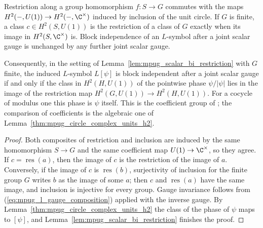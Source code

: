 \begin{lemma}
    \label{lem:mpug_scalar_bi_restriction_circle}
    \leanok
    Restriction along a group homomorphism $f\colon S\to G$ commutes with
    the maps $H^2(-,U(1))\to H^2(-,\C^\times)$ induced by inclusion of the
    unit circle. If $G$ is finite, a class $c\in H^2(S,U(1))$ is the
    restriction of a class of $G$ exactly when its image in
    $H^2(S,\C^\times)$ is. Block independence of an $L$-symbol after
    a joint scalar gauge is unchanged by any further joint scalar gauge.

    Consequently, in the setting of Lemma~\ref{lem:mpug_scalar_bi_restriction}
    with $G$ finite, the induced $L$-symbol $L[\psi]$ is block independent
    after a joint scalar gauge if and only if the class in $H^2(H,U(1))$ of
    the pointwise phase $\psi/|\psi|$ lies in the image of the restriction map
    $H^2(G,U(1))\to H^2(H,U(1))$. For a cocycle of modulus one this phase is
    $\psi$ itself. This is the coefficient group of
    \cite[lines~7042--7064]{FrancoRubio2025MPUGauging}; the comparison of
    coefficients is the algebraic one of
    Lemma~\ref{thm:mpug_circle_complex_units_h2}.
\end{lemma}

\begin{proof}\leanok
    Both composites of restriction and inclusion are induced by the same
    homomorphism $S\to G$ and the same coefficient map
    $U(1)\to\C^\times$, so they agree. If $c=\operatorname{res}(a)$, then
    the image of $c$ is the restriction of the image of $a$. Conversely, if
    the image of $c$ is $\operatorname{res}(b)$, surjectivity of inclusion
    for the finite group $G$ writes $b$ as the image of some $a$; then $c$
    and $\operatorname{res}(a)$ have the same image, and inclusion is
    injective for every group. Gauge invariance follows from
    (\ref{eq:mpug_l_gauge_composition}) applied with the inverse gauge. By
    Lemma~\ref{thm:mpug_circle_complex_units_h2} the class of the phase of
    $\psi$ maps to $[\psi]$, and Lemma~\ref{lem:mpug_scalar_bi_restriction}
    finishes the proof.
\end{proof}

